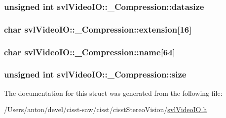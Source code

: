 \subsubsection[{datasize}]{\setlength{\rightskip}{0pt plus 5cm}unsigned int svl\+Video\+I\+O\+::\+\_\+\+Compression\+::datasize}\label{structsvl_video_i_o_1_1___compression_a6876320ec774c4563aec48b1cb5d1d52}
\hypertarget{structsvl_video_i_o_1_1___compression_a37304e722770d959f8e7a145f970217c}{}
\subsubsection[{extension}]{\setlength{\rightskip}{0pt plus 5cm}char svl\+Video\+I\+O\+::\+\_\+\+Compression\+::extension\mbox{[}16\mbox{]}}\label{structsvl_video_i_o_1_1___compression_a37304e722770d959f8e7a145f970217c}
\hypertarget{structsvl_video_i_o_1_1___compression_a07b33b8e0f25c4109e482b82cfa556ea}{}
\subsubsection[{name}]{\setlength{\rightskip}{0pt plus 5cm}char svl\+Video\+I\+O\+::\+\_\+\+Compression\+::name\mbox{[}64\mbox{]}}\label{structsvl_video_i_o_1_1___compression_a07b33b8e0f25c4109e482b82cfa556ea}
\hypertarget{structsvl_video_i_o_1_1___compression_a82d6debeaf90fa62810321f750db7698}{}
\subsubsection[{size}]{\setlength{\rightskip}{0pt plus 5cm}unsigned int svl\+Video\+I\+O\+::\+\_\+\+Compression\+::size}\label{structsvl_video_i_o_1_1___compression_a82d6debeaf90fa62810321f750db7698}


The documentation for this struct was generated from the following file\+:\begin{DoxyCompactItemize}
\item 
/\+Users/anton/devel/cisst-\/saw/cisst/cisst\+Stereo\+Vision/\hyperlink{svl_video_i_o_8h}{svl\+Video\+I\+O.\+h}\end{DoxyCompactItemize}
